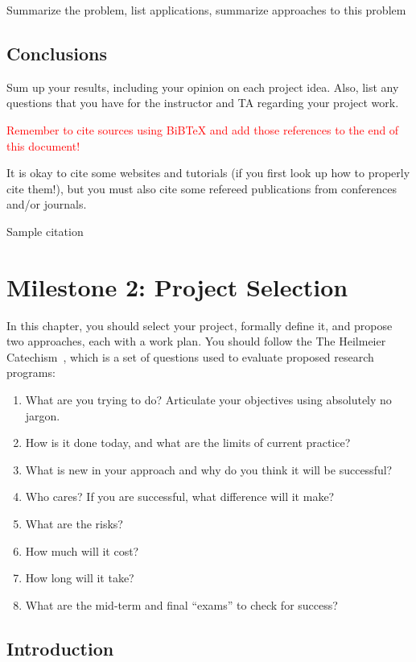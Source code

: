 \documentclass{report}
\begin{document}
Summarize the problem, list applications, summarize approaches to this problem 

\section{Conclusions}

Sum up your results, including your opinion on each project idea.  Also, list any questions that you have for the instructor and TA regarding your project work.

\textcolor{red}{Remember to cite sources using BiBTeX and add those references to the end of this document!}

It is okay to cite some websites and tutorials (if you first look up how to properly cite them!), but you must also cite some refereed publications from conferences and/or journals.

Sample citation~\cite{Samuel59}

\chapter{Milestone 2: Project Selection}

In this chapter, you should select your project, formally define it, and propose two approaches, each with a work plan.  You should follow the The Heilmeier Catechism~\cite{heilmeier}, which is a set of questions used to evaluate proposed research programs:  
\begin{enumerate}
    \item What are you trying to do? Articulate your objectives using absolutely no jargon.
   \item How is it done today, and what are the limits of current practice?
   \item What is new in your approach and why do you think it will be successful?
   \item Who cares? If you are successful, what difference will it make?
   \item What are the risks?
   \item How much will it cost?
   \item How long will it take?
   \item What are the mid-term and final ``exams'' to check for success?
\end{enumerate}

\section{Introduction}
\end{document}
